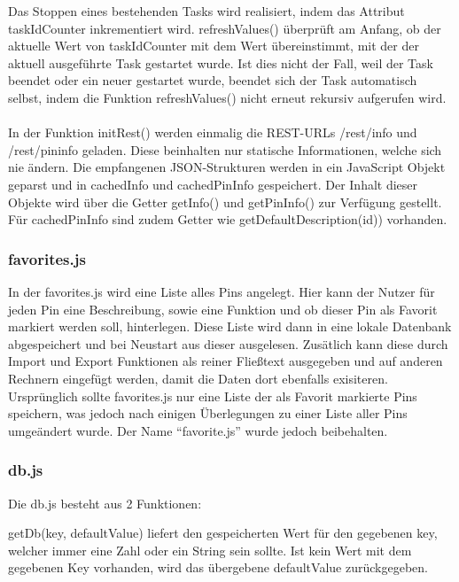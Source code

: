 Das Stoppen eines bestehenden Tasks wird realisiert, indem das Attribut
\textrm{taskIdCounter} inkrementiert wird. \textrm{refreshValues()} überprüft am
Anfang, ob der aktuelle Wert von \textrm{taskIdCounter} mit dem Wert
übereinstimmt, mit der der aktuell ausgeführte Task gestartet wurde. Ist dies
nicht der Fall, weil der Task beendet oder ein neuer gestartet wurde, beendet
sich der Task automatisch selbst, indem die Funktion \textrm{refreshValues()}
nicht erneut rekursiv aufgerufen wird.\\
\\
In der Funktion \textrm{initRest()} werden einmalig die REST-URLs
\textrm{/rest/info} und \textrm{/rest/pininfo} geladen. Diese beinhalten nur
statische Informationen, welche sich nie ändern. Die empfangenen JSON-Strukturen
werden in ein JavaScript Objekt geparst und in \textrm{cachedInfo} und
\textrm{cachedPinInfo} gespeichert. Der Inhalt dieser Objekte wird über
die Getter \textrm{getInfo()} und \textrm{getPinInfo()} zur Verfügung gestellt.
Für \textrm{cachedPinInfo} sind zudem Getter wie
\textrm{getDefaultDescription(id))} vorhanden.


\subsubsection{favorites.js}

In der favorites.js wird eine Liste alles Pins angelegt. Hier kann der Nutzer für jeden Pin eine
Beschreibung, sowie eine Funktion und ob dieser Pin als Favorit markiert werden soll, 
hinterlegen. Diese Liste wird dann in eine lokale Datenbank abgespeichert und bei Neustart aus dieser ausgelesen. 
Zusätlich kann diese durch Import und Export Funktionen als reiner Fließtext ausgegeben und auf anderen Rechnern 
eingefügt werden, damit die Daten dort ebenfalls exisiteren.\\
Ursprünglich sollte favorites.js nur eine Liste der als Favorit markierte Pins speichern, 
was jedoch nach einigen Überlegungen zu einer Liste aller Pins umgeändert wurde. Der Name 
"`favorite.js"' wurde jedoch beibehalten.

\subsubsection{db.js}
Die \textrm{db.js} besteht aus 2 Funktionen: 

\textrm{getDb(key, defaultValue)} liefert den gespeicherten Wert für den
gegebenen \textrm{key}, welcher immer eine Zahl oder ein String sein sollte. Ist
kein Wert mit dem gegebenen Key vorhanden, wird das
übergebene \textrm{defaultValue} zurückgegeben.

